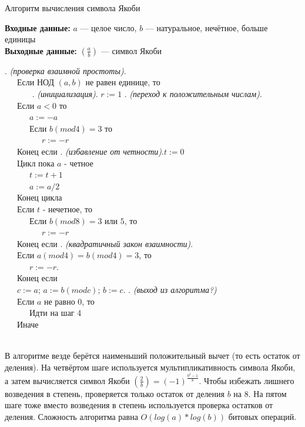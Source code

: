 \documentclass[11pt]{article}
\begin{document}
\begin{algorithm}[ph]
	\caption{Алгоритм вычисления символа Якоби}
	\label{alg:AlgName}
	\textbf{Входные данные:} $a$ — целое число, $b$ — натуральное, нечётное, больше единицы\\
	\textbf{Выходные данные:} $(\frac{a}{b})$ — символ Якоби
	
	\begin{algorithmic}
		
		. \textit{(проверка взаимной простоты)}.\\
		\ \ \ Если НОД $(a,b)$ не равен единице, то\\
		\ \ \ \ \ \ 
		. \textit{(инициализация)}. $r:=1$
		. \textit{(переход к положительным числам)}.\\
		\ \ \ Если $a<0$ то\\
		\ \ \ \ \ \ $a:=-a$\\
		\ \ \ \ \ \ Если $b (mod 4) = 3$ то\\
		\ \ \ \ \ \ \ \ \ $r:=-r$\\
		\ \ \ Конец если
		. \textit{(избавление от четности)}.$t:=0$\\
		\ \ \ Цикл пока $a$ - четное\\
		\ \ \ \ \ \ $t:=t+1$\\
		\ \ \ \ \ \ $a:=a/2$\\
		\ \ \ Конец цикла\\
		\ \ \ Если $t$ - нечетное, то\\
		\ \ \ \ \ \ Если $b(mod 8)=3$ или $5$, то\\
		\ \ \ \ \ \ \ \ \ $r:=-r$\\
		\ \ \ Конец если
		. \textit{(квадратичный закон взаимности)}.\\ 
		\ \ \ Если $a(mod 4) = b (mod 4) = 3$, то\\
		\ \ \ \ \ \ $r:=-r$.\\
		\ \ \ Конец если\\
  		\ \ \ $c:=a$; $a:=b (mod c)$; $b:=c$.
		. \textit{(выход из алгоритма?)}\\
		\ \ \ Если $a$ не равно $0$, то\\
		\ \ \ \ \ \ Идти на шаг 4\\
		\ \ \ Иначе\\
		\ \ \ \ \ \  
	\end{algorithmic}

\end{algorithm}
В алгоритме везде берётся наименьший положительный вычет (то есть остаток от деления).
На четвёртом шаге используется мультипликативность символа Якоби, а затем вычисляется символ Якоби $(\frac{2}{b})=(-1)^\frac{b^2-1}{8}$. Чтобы избежать лишнего возведения в степень, проверяется только остаток от деления $b$ на 8. На пятом шаге тоже вместо возведения в степень используется проверка остатков от деления. Сложность алгоритма равна $O(log(a)*log(b))$ битовых операций.
\end{document}
